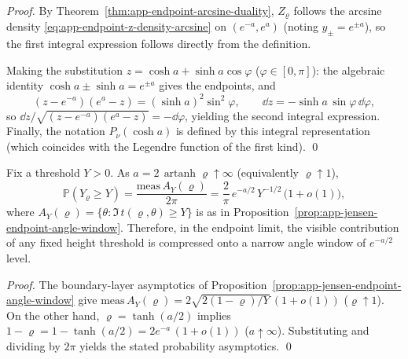 \begin{proof}
By Theorem~\ref{thm:app-endpoint-arcsine-duality}, \(Z_{\varrho}\) follows the arcsine density \eqref{eq:app-endpoint-z-density-arcsine} on \((e^{-a},e^{a})\) (noting \(y_{\pm}=e^{\pm a}\)), so the first integral expression follows directly from the definition.
\par
Making the substitution \(z=\cosh a+\sinh a\cos\varphi\) (\(\varphi\in[0,\pi]\)):
the algebraic identity \(\cosh a\pm\sinh a=e^{\pm a}\) gives the endpoints,
and
\[
(z-e^{-a})(e^{a}-z)=(\sinh a)^{2}\sin^{2}\varphi,
\qquad
\dd z=-\sinh a\,\sin\varphi\,\dd\varphi,
\]
so
\(
\dd z/\sqrt{(z-e^{-a})(e^{a}-z)}=-\dd\varphi
\), yielding the second integral expression.
Finally, the notation \(P_{\nu}(\cosh a)\) is defined by this integral representation (which coincides with the Legendre function of the first kind). \qed
\end{proof}

\begin{corollary}\label{cor:app-endpoint-window-exp-half}
Fix a threshold \(Y>0\).
As \(a=2\,\operatorname{artanh}\varrho\uparrow\infty\) (equivalently \(\varrho\uparrow 1\)),
\[
\mathbb{P}(Y_{\varrho}\ge Y)
=\frac{\mathrm{meas}\,A_{Y}(\varrho)}{2\pi}
=\frac{2}{\pi}\,e^{-a/2}\,Y^{-1/2}\,\bigl(1+o(1)\bigr),
\]
where \(A_Y(\varrho)=\{\theta:\Im\,t(\varrho,\theta)\ge Y\}\) is as in Proposition~\ref{prop:app-jensen-endpoint-angle-window}.
Therefore, in the endpoint limit, the visible contribution of any fixed height threshold is compressed onto a narrow angle window of \(e^{-a/2}\) level.
\end{corollary}

\begin{proof}
The boundary-layer asymptotics of Proposition~\ref{prop:app-jensen-endpoint-angle-window} give
\(
\mathrm{meas}\,A_Y(\varrho)=2\sqrt{2(1-\varrho)/Y}\,(1+o(1))
\) (\(\varrho\uparrow 1\)).
On the other hand, \(\varrho=\tanh(a/2)\) implies
\(
1-\varrho=1-\tanh(a/2)=2e^{-a}\,(1+o(1))
\) (\(a\uparrow\infty\)).
Substituting and dividing by \(2\pi\) yields the stated probability asymptotics. \qed
\end{proof}

